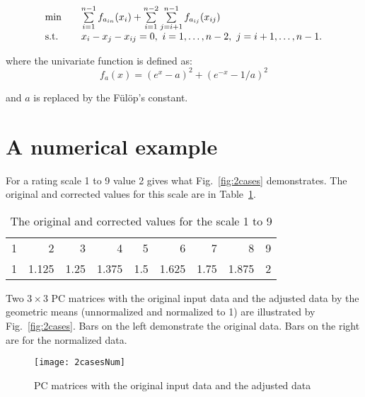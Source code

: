 \documentclass [12pt]{article}
\begin{document}
\begin{equation}
\begin{array}{lll}
\min &&\sum\limits_{i=1}^{n-1} f_{a_{in}}(x_i)+
\sum\limits_{i=1}^{n-2}
\sum\limits_{j=i+1}^{n-1} f_{a_{ij}}(x_{ij})\\
{\rm s.t.} &&x_i-x_j-x_{ij}=0,\ i=1,\dots ,n-2,\ j=i+1,\dots ,n-1.
\end{array}
\label{eq:b8}
\end{equation}

\noindent where the univariate function is defined as:
\begin{equation} f_a(x)=\left (
e^x-a\right )^2+\left( e^{-x}-1/a\right )^2 \label{eq:b7}
\end{equation}

\noindent and $a$ is replaced by the F\"ul\"op's constant. 

\noindent 



\section{A numerical example}
\label{example}

For a rating scale 1 to 9 value 2 gives what Fig.~\ref{fig:2cases} demonstrates. The original and corrected values for this scale are in Table~\ref{tab:corr9}. 
\begin{table}[h]
  \centering
  \caption{The original and corrected values for the scale 1 to 9}
    \begin{tabular}{rrrrrrrrr} 
   \hline 
    1     & 2     & 3     & 4     & 5     & 6     & 7     & 8     & 9 \\
1     & 1.125 & 1.25  & 1.375 & 1.5   & 1.625 & 1.75  & 1.875 & 2 \\
  \hline
    \end{tabular}\label{tab:corr9}\end{table}
Two $3 \times 3$ PC matrices  with the original input data and the adjusted data by the geometric means (unnormalized and normalized to 1) are illustrated by Fig.~\ref{fig:2cases}. Bars on the left demonstrate the original data. Bars on the right are for the normalized data. 

\begin{figure}[p]
\centering
\texttt{[image: 2casesNum]}
\caption[PC matrices with the original input data and the adjusted data]{PC matrices with the original input data and the adjusted data}
\label{fig:2casesNum}
\end{figure}
\end{document}
